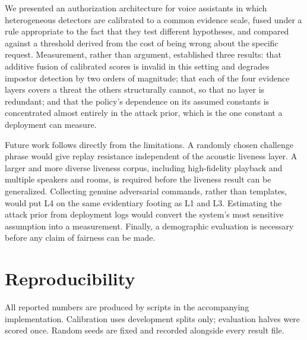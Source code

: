 \documentclass[conference]{IEEEtran}
\begin{document}
We presented an authorization architecture for voice assistants in which
heterogeneous detectors are calibrated to a common evidence scale, fused under
a rule appropriate to the fact that they test different hypotheses, and
compared against a threshold derived from the cost of being wrong about the
specific request. Measurement, rather than argument, established three results:
that additive fusion of calibrated scores is invalid in this setting and
degrades impostor detection by two orders of magnitude; that each of the four
evidence layers covers a threat the others structurally cannot, so that no
layer is redundant; and that the policy's dependence on its assumed constants
is concentrated almost entirely in the attack prior, which is the one constant
a deployment can measure.

Future work follows directly from the limitations. A randomly chosen challenge
phrase would give replay resistance independent of the acoustic liveness layer.
A larger and more diverse liveness corpus, including high-fidelity playback and
multiple speakers and rooms, is required before the liveness result can be
generalized. Collecting genuine adversarial commands, rather than templates,
would put L4 on the same evidentiary footing as L1 and L3. Estimating the
attack prior from deployment logs would convert the system's most sensitive
assumption into a measurement. Finally, a demographic evaluation is necessary
before any claim of fairness can be made.

\section*{Reproducibility}

All reported numbers are produced by scripts in the accompanying
implementation. Calibration uses development splits only; evaluation halves
were scored once. Random seeds are fixed and recorded alongside every result
file.
\end{document}
